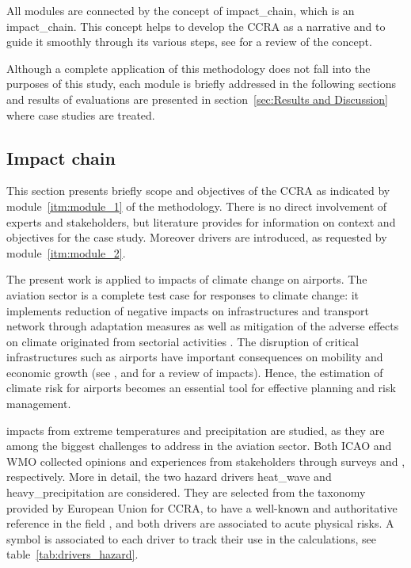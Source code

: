 All modules are connected by the concept of \gls{impact_chain}, which is an \glsdesc{impact_chain}. This concept helps to develop the \gls{CCRA} as a narrative and to guide it smoothly through its various steps, see \cite[217-224]{2022KondrupClimateAdaptation} for a review of the concept.

Although a complete application of this methodology does not fall into the purposes of this study, each module is briefly addressed in the following sections and results of evaluations are presented in section~\ref{sec:Results and Discussion} where case studies are treated.



\subsection{Impact chain}
\label{sec:Impact chain}
This section presents briefly scope and objectives of the \gls{CCRA} as indicated by module~\ref{itm:module_1} of the methodology. There is no direct involvement of experts and stakeholders, but literature provides for information on context and objectives for the case study. Moreover \glspl{driver} are introduced, as requested by module~\ref{itm:module_2}.

The present work is applied to impacts of climate change on airports.
The aviation sector is a complete test case for responses to climate change: it implements reduction of negative \glspl{impact} on infrastructures and transport network through adaptation measures as well as mitigation of the adverse effects on climate originated from sectorial activities \cite{2022ICAOICAOEnvironmental}. The disruption of critical infrastructures such as airports have important consequences on mobility and economic growth (see \cite{2018ICAOClimateAdaptation}, \cite[15]{2016BurbidgeAdaptingEuropean} and \cite[548]{2022DeVivoRiskAssessment} for a review of impacts). Hence, the estimation of climate \gls{risk} for airports becomes an essential tool for effective planning and risk management.

\Glspl{impact} from extreme temperatures and precipitation are studied, as they are among the biggest challenges to address in the aviation sector. Both \Gls{ICAO} and \gls{WMO} collected opinions and experiences from stakeholders through surveys \cite[62]{2018ICAOClimateAdaptation} and \cite[34]{2020WorldMeteorologicalOrganizationWMOOutcomesOf}, respectively.
More in detail, the two \gls{hazard} \glspl{driver} \gls{heat_wave} and \gls{heavy_precipitation} are considered. They are selected from the taxonomy provided by European Union for \gls{CCRA}, to have a well-known and authoritative reference in the field \cite[177]{2024EU20212139}, and both drivers are associated to acute physical risks. A symbol is associated to each \gls{driver} to track their use in the calculations, see table~\ref{tab:drivers_hazard}.

